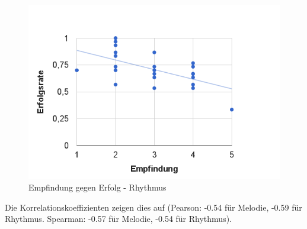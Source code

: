 \documentclass{acm_proc_article-sp}
\begin{document}
\begin{figure}[H]
\includegraphics[width=1.0\linewidth]{Abbildungen/Empfindugn-Erfolg_Rhythmus.png}
\caption{Empfindung gegen Erfolg - Rhythmus}
\label{Geschlechter}
\end{figure}
Die Korrelationskoeffizienten zeigen dies auf (Pearson: -0.54 für Melodie, -0.59 für Rhythmus. Spearman: -0.57 für Melodie, -0.54 für Rhythmus).
\end{document}
